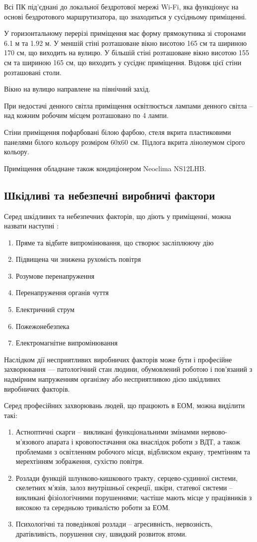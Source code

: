 \documentclass[a4paper,12pt]{article}
\begin{document}
Всі ПК під’єднані до локальної бездротової мережі Wi-Fi, яка функціонує на основі бездротового маршрутизатора, що знаходиться у сусідньому приміщенні.

У горизонтальному перерізі приміщення має форму прямокутника зі сторонами 6.1 м та 1.92 м. У меншій стіні розташоване вікно висотою 165 см та шириною 170 см, що виходить на вулицю. У більшій стіні розташоване вікно  висотою 155 см та шириною 165 см, що виходить у сусіднє приміщення. Вздовж цієї стіни розташовані столи.

Вікно на вулицю направлене на північний захід.

При недостачі денного світла приміщення освітлюється лампами денного світла -- над кожним робочим місцем розташовано по 4 лампи.

Стіни приміщення пофарбовані білою фарбою, стеля вкрита пластиковими панелями білого кольору розміром 60х60 см. Підлога вкрита лінолеумом сірого кольору.

Приміщення обладнане також кондиціонером Neoclima NS12LHB.

\subsection{Шкідливі та небезпечні виробничі фактори}
Серед шкідливих та небезпечних факторів, що діють у приміщенні, можна назвати наступні \cite{gost_fact}:
\begin{enumerate}
\item Пряме та відбите випромінювання, що створює засліплюючу дію
\item Підвищена чи знижена рухомість повітря
\item Розумове перенапруження
\item Перенапруження органів чуття
\item Електричний струм
\item Пожежонебезпека
\item Електромагнітне випромінювання
\end{enumerate}

Наслідком дії несприятливих виробничих факторів може бути і професійне захворювання — патологічний стан людини, обумовлений роботою і пов’язаний з надмірним напруженням організму або несприятливою дією шкідливих виробничих факторів.

Серед професійних захворювань людей, що працюють в ЕОМ, можна виділити такі:
\begin{enumerate}
\item Астноптичні скарги -- викликані функціональними змінамми нервово-м’язового апарата і кровопостачання ока внаслідок роботи з ВДТ, а також проблемами з освітленням робочого місця, відблиском екрану, тремтінням та мерехтінням зображення, сухістю повітря.
\item Розлади функцій шлунково-кишкового тракту, серцево-судинної системи, скелетних м’язів, залоз внутрішньої секреції, шкіри, статевої системи -- викликані фізіологічними порушеннями; частіше мають місце у працівників з високою та середньою тривалістю роботи за ЕОМ.
\item Психологічні та поведінкові розлади -- агресивність, нервозність, дратівливість, порушення сну, швидкий розвиток втоми.
\end{enumerate}
\end{document}
